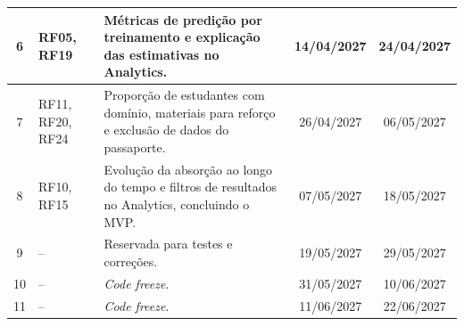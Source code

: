 {\begin{longtable}{c>{\raggedright\arraybackslash}p{2.3cm}>{\raggedright\arraybackslash}p{6.3cm}cc}
\hline
6 & RF05, RF19 & Métricas de predição por treinamento e explicação das estimativas no Analytics. & 14/04/2027 & 24/04/2027 \\
\hline
7 & RF11, RF20, RF24 & Proporção de estudantes com domínio, materiais para reforço e exclusão de dados do passaporte. & 26/04/2027 & 06/05/2027 \\
\hline
8 & RF10, RF15 & Evolução da absorção ao longo do tempo e filtros de resultados no Analytics, concluindo o MVP. & 07/05/2027 & 18/05/2027 \\
\hline
9 & -- & Reservada para testes e correções. & 19/05/2027 & 29/05/2027 \\
\hline
10 & -- & \textit{Code freeze}. & 31/05/2027 & 10/06/2027 \\
\hline
11 & -- & \textit{Code freeze}. & 11/06/2027 & 22/06/2027 \\
\hline
\end{longtable}
}
